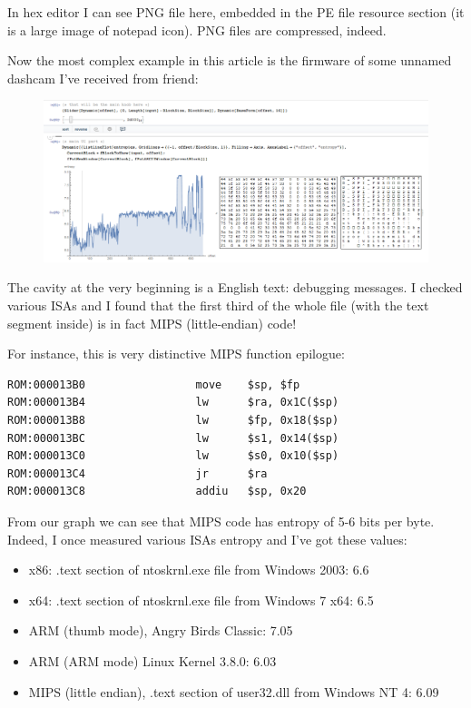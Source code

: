 In hex editor I can see PNG file here, embedded in the PE file resource section (it is a large image of notepad icon).
PNG files are compressed, indeed.


Now the most complex example in this article is the firmware of some unnamed dashcam I've received from friend:

\begin{figure}[H]
\centering
\includegraphics[scale=\FigScale]{ff/entropy/dashcam_text.png}
\end{figure}

The cavity at the very beginning is a English text: debugging messages.
I checked various ISAs and I found that 
the first third of the whole file (with the text segment inside) is in fact MIPS (little-endian) code!

For instance, this is very distinctive MIPS function epilogue:

\begin{lstlisting}
ROM:000013B0                 move    $sp, $fp
ROM:000013B4                 lw      $ra, 0x1C($sp)
ROM:000013B8                 lw      $fp, 0x18($sp)
ROM:000013BC                 lw      $s1, 0x14($sp)
ROM:000013C0                 lw      $s0, 0x10($sp)
ROM:000013C4                 jr      $ra
ROM:000013C8                 addiu   $sp, 0x20
\end{lstlisting}

From our graph we can see that MIPS code has entropy of 5-6 bits per byte.
Indeed, I once measured various ISAs entropy and I've got these values:

\begin{itemize}
\item x86: .text section of ntoskrnl.exe file from Windows 2003: 6.6
\item x64: .text section of ntoskrnl.exe file from Windows 7 x64: 6.5
\item ARM (thumb mode), Angry Birds Classic: 7.05
\item ARM (ARM mode) Linux Kernel 3.8.0: 6.03
\item MIPS (little endian), .text section of user32.dll from Windows NT 4: 6.09
\end{itemize}

